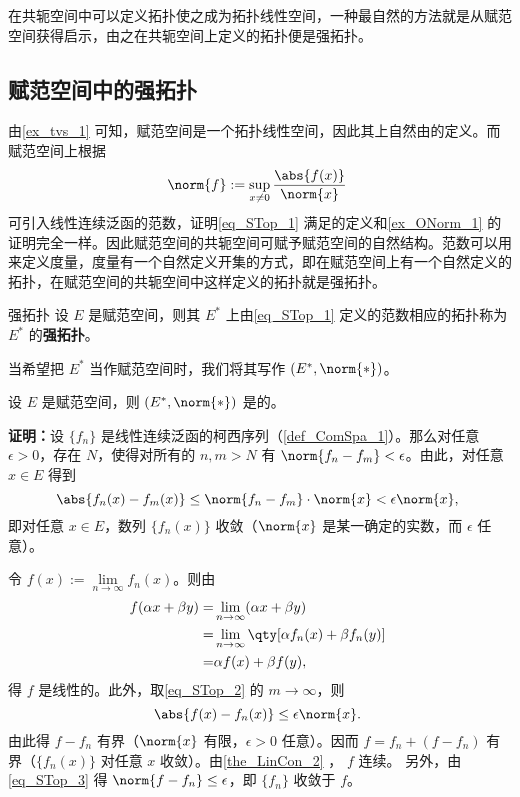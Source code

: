 
在共轭空间中可以定义拓扑使之成为拓扑线性空间，一种最自然的方法就是从赋范空间获得启示，由之在共轭空间上定义的拓扑便是强拓扑。

\subsection{赋范空间中的强拓扑}

由\autoref{ex_tvs_1} 可知，赋范空间是一个拓扑线性空间，因此其上自然由的定义。而赋范空间上根据
\begin{equation}\label{eq_STop_1}
\norm{f}:=\sup_{x\neq0}\frac{\abs{f(x)}}{\norm{x}}~
\end{equation}
可引入线性连续泛函的范数，证明\autoref{eq_STop_1} 满足的定义和\autoref{ex_ONorm_1} 的证明完全一样。因此赋范空间的共轭空间可赋予赋范空间的自然结构。范数可以用来定义度量，度量有一个自然定义开集的方式，即在赋范空间上有一个自然定义的拓扑，在赋范空间的共轭空间中这样定义的拓扑就是强拓扑。
\begin{definition}{强拓扑}
设 $E$ 是赋范空间，则其 $E^*$ 上由\autoref{eq_STop_1} 定义的范数相应的拓扑称为 $E^*$ 的\textbf{强拓扑}。
\end{definition}

当希望把 $E^*$ 当作赋范空间时，我们将其写作 $(E^*,\norm{*})$。

\begin{theorem}{}
设 $E$ 是赋范空间，则 $(E^*,\norm{*})$ 是的。
\end{theorem}

\textbf{证明：}设 $\{f_n\}$ 是线性连续泛函的柯西序列（\autoref{def_ComSpa_1}）。那么对任意 $\epsilon>0$，存在 $N$，使得对所有的 $n,m>N$ 有 $\norm{f_n-f_m}<\epsilon$。由此，对任意 $x\in E$ 得到
\begin{equation}\label{eq_STop_2}
\abs{f_n(x)-f_m(x)}\leq\norm{f_n-f_m}\cdot\norm{x}<\epsilon\norm{x},~
\end{equation}
即对任意 $x\in E$，数列 $\{f_n(x)\}$ 收敛（$\norm{x}$ 是某一确定的实数，而 $\epsilon$ 任意）。

令 $f(x):=\lim\limits_{n\rightarrow\infty}f_n(x)$。则由
\begin{equation}
\begin{aligned}
f(\alpha x+\beta y)=&\lim_{n\rightarrow\infty}(\alpha x+\beta y)\\
=&\lim_{n\rightarrow\infty}\qty[\alpha f_n(x)+\beta f_n(y)]\\
=&\alpha f(x)+\beta f(y),
\end{aligned}~
\end{equation}
得 $f$ 是线性的。此外，取\autoref{eq_STop_2} 的 $m\rightarrow\infty$，则 
\begin{equation}\label{eq_STop_3}
\abs{f(x)-f_n(x)}\leq \epsilon\norm{x}.~
\end{equation}
由此得 $f-f_n$ 有界（$\norm{x}$ 有限，$\epsilon>0$ 任意）。因而 $f=f_n+(f-f_n)$ 有界（$\{f_n(x)\}$ 对任意 $x$ 收敛）。由\autoref{the_LinCon_2} ， $f$ 连续。 另外，由\autoref{eq_STop_3} 得 $\norm{f-f_n}\leq\epsilon$，即 $\{f_n\}$ 收敛于 $f$。


